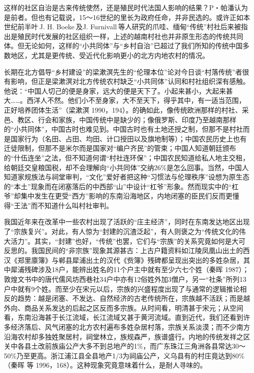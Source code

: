 \documentclass[a4paper,12pt,punct=kaiming]{ctexart}
\begin{document}
这样的社区自治是古来传统使然，还是殖民时代法国人影响的结果？P・帕潘认为是前者。但也有记载说，15～16世纪的里长为政府任命，并非民选的。或许正如本世纪前半叶 J. H. Boeke 及J. Furnivall 等人研究的爪哇、缅甸“传统”村社后来被指出是殖民时代发展的社区组织一样，上述的越南村社也并非原生形态的传统共同体。但无论如何，这样的“小共同体”与“乡村自治”已超过了我们所知的传统中国多数地区，尤其是更传统、受近代化影响更小的北方内地农村的情况。

长期在北方倡导“乡村建设”的梁漱溟先生的“伦理本位”论对今日谈“村落传统”者很有影响，但正是梁漱溟对北方传统农村缺乏“小共同体”认同和村社组织深有感触。他说：“中国人切己的便是身家，远大的便是天下了。小起来甚小，大起来甚大……。西洋人不然。他们小不至身家，大不至天下，得乎其中，有一适当范围，正好培养团体生活”（梁漱溟 1990，194）。的确如此，像传统欧洲那样的村社、采邑、教区、行会和家族，中国传统中是缺少的；像俄罗斯、印度乃至越南那样的“小共同体”，中国古时也难见到。中国古时也有土地还授之制，但那不是村社而是国家行为（名田、占田、均田、计口授田以及旗地制等）；中国农民历史上也有迁徒限制，但那不是米尔而是国家对“编户齐民”的管束；中国人知道朝廷颁布的“什伍连坐”之法，但不知道何谓“村社连环保”；中国农民知道给私人地主交租，给朝廷交皇粮国税，却不会理解向“小共同体”交纳26\%是怎么回事。当然，中国人知道家规族法与祠堂审判，“文化”爱好者把这种“习惯法与伦理秩序”设想为原生态的“本土”现象而在闭塞落后的中西部“山”中设计“杠爷”形象。然而现实中的“杠爷”却集中发生在更受“西方”影响的东南沿海地区，内地闭塞的臣民们反而更懂得“王法”而不知道什么叫村社审判。

我国近年来在改革中一些农村出现了活跃的“庄主经济”，同时在东南发达地区出现了“宗族复兴”。对此，有人惊为“封建的沉渣泛起”，有人则褒之为“传统文化的伟大活力”。其实，“封建”也好，“传统”也罢，它们与“宗族”的关系究竟如何是大可反思的。我国民间的“非宗族”现象其源甚古：上古户籍资料如江陵凤凰山出土的西汉《郑里廪簿》与郸县犀浦出土的汉代《赀簿》残碑都呈现出突出的多姓杂居，其中犀浦残碑涉及18户，能辨出姓名的11个户主中就有至少六七个姓（秦晖 1987）；敦煌文书中的唐代儒风坊西巷社34户中亦有12俗姓外加3僧户，另一“社条”所列13户中就有9个姓。而至少在宋元以后，宗族的兴盛程度出现了与通常的逻辑推论相反的趋势：越是闭塞、不发达、自然经济的古老传统所在，宗族越不活跃；而是越外向、商品关系发达的后起之区反而多宗族。从时间看，明清甚于宋元；从空间看，东南沿海甚于长江流域，长江流域又甚于黄河流域。直到近代，我们还看到许多经济落后、风气闭塞的北方农村遍布多姓杂居村落，宗族关系淡漠；而不少南方沿海农村却多独姓聚居村，祠堂林立，族规森严，族谱盛行。内地的传统发祥之区关中各县土改前族庙公产大多不到总地产的1\%，而广东珠江三角洲各县常达30～50\%乃至更高。浙江浦江县全县地产1/3为祠庙公产，义乌县有的村庄竟达到80\%（秦晖 等 1996，168）。这种现象究竟意味着什么，是耐人寻味的。
\end{document}
